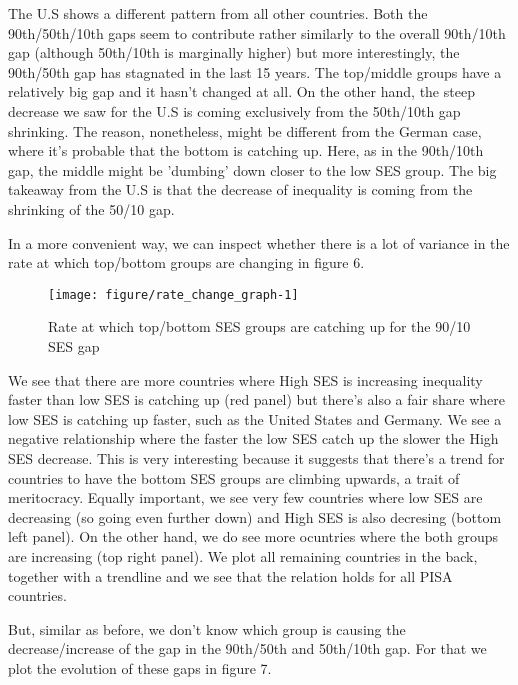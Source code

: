 \documentclass[11pt, a4paper]{article}\usepackage[]{graphicx}\usepackage[]{color}
\begin{document}
The U.S shows a different pattern from all other countries. Both the 90th/50th/10th gaps seem to contribute rather similarly to the overall 90th/10th gap (although 50th/10th is marginally higher) but more interestingly, the 90th/50th gap has stagnated in the last 15 years. The top/middle groups have a relatively big gap and it hasn't changed at all. On the other hand, the steep decrease we saw for the U.S is coming exclusively from the 50th/10th gap shrinking. The reason, nonetheless, might be different from the German case, where it's probable that the bottom is catching up. Here, as in the 90th/10th gap, the middle might be 'dumbing' down closer to the low SES group. The big takeaway from the U.S is that the decrease of inequality is coming from the shrinking of the 50/10 gap.

In a more convenient way, we can inspect whether there is a lot of variance in the rate at which top/bottom groups are changing in figure 6.



\begin{figure}
\begin{center}


{\centering \texttt{[image: figure/rate\_change\_graph-1]} 

}



\caption{Rate at which top/bottom SES groups are catching up for the 90/10 SES gap}
\end{center}
\end{figure}

We see that there are more countries where High SES is increasing inequality faster than low SES is catching up (red panel) but there's also a fair share where low SES is catching up faster, such as the United States and Germany. We see a negative relationship where the faster the low SES catch up the slower the High SES decrease. This is very interesting because it suggests that there's a trend for countries to have the bottom SES groups are climbing upwards, a trait of meritocracy. Equally important, we see very few countries where low SES are decreasing (so going even further down) and High SES is also decresing (bottom left panel). On the other hand, we do see more ocuntries where the both groups are increasing (top right panel). We plot all remaining countries in the back, together with a trendline and we see that the relation holds for all PISA countries.

But, similar as before, we don't know which group is causing the decrease/increase of the gap in the 90th/50th and 50th/10th gap. For that we plot the evolution of these gaps in figure 7.
\end{document}
